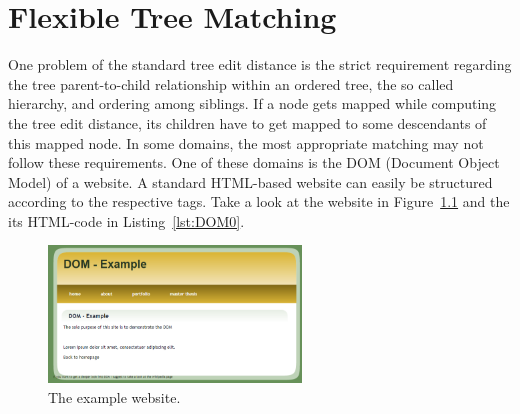 \chapter{Flexible Tree Matching}
One problem of the standard tree edit distance is the strict requirement regarding the tree parent-to-child relationship within an ordered tree, the so called hierarchy, and ordering among siblings. If a node gets mapped while computing the tree edit distance, its children have to get mapped to some descendants of this mapped node. In some domains, the most appropriate matching may not follow these requirements. One of these domains is the DOM (Document Object Model) of a website. A standard HTML-based website can easily be structured according to the respective tags. Take a look at the website in Figure~\ref{fig:website_0} and the its HTML-code in Listing~\ref{lst:DOM0}. 
\begin{figure}[!h]
    \centering
        \includegraphics[width=0.60\textwidth]{figures/DOM_website.png}
        \caption{The example website.}
        \label{fig:website_0}
\end{figure} 


